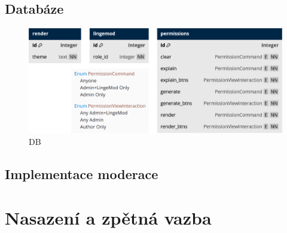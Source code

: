 \documentclass[FM]{tulthesis}
\begin{document}
	
	\subsection{Databáze}
	
	\begin{figure}[ht]
		\centering
		\includegraphics[width=\textwidth]{img/Database}
		\caption{DB}
	\end{figure}
	
	
	\subsection{Implementace moderace}


	
	\section{Nasazení a zpětná vazba}
	
	
\end{document}
